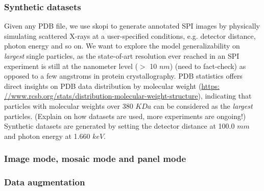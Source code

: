 \subsubsection{Synthetic datasets}

Given any PDB file, we use skopi \cite{peckSkopiSimulationPackage2021} to
generate annotated SPI images by physically simulating scattered X-rays at a
user-specified conditions, e.g. detector distance, photon energy and so on. We
want to explore the model generalizability on \textit{largest} single particles,
as the state-of-art resolution ever reached in an SPI experiment is still at the
nanometer level ($>$ 10 $nm$) {\color{red}(need to fact-check)} as opposed to a
few angstroms in protein crystallography.  PDB statistics offers direct insights
on PDB data distribution by molecular weight (\url{https:
//www.rcsb.org/stats/distribution-molecular-weight-structure}), indicating that
particles with molecular weights over 380 $KDa$ can be considered as the
\textit{largest} particles.  {\color{red}(Explain on how datasets are used, more
experiments are ongoing!)} Synthetic datasets are generated by setting the
detector distance at 100.0 $mm$ and photon energy at 1.660 $keV$.  

\subsubsection{Image mode, mosaic mode and panel mode}


\subsubsection{Data augmentation}


